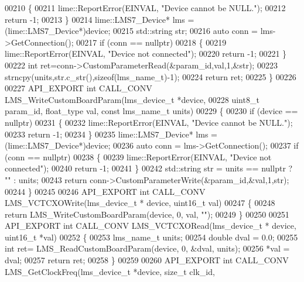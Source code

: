 \begin{DoxyCode}
00210     \{
00211         lime::ReportError(EINVAL, \textcolor{stringliteral}{"Device cannot be NULL."});
00212         \textcolor{keywordflow}{return} -1;
00213     \}
00214     lime::LMS7_Device* lms = (lime::LMS7_Device*)device;
00215     std::string str;
00216     \textcolor{keyword}{auto} conn = lms->GetConnection();
00217     \textcolor{keywordflow}{if} (conn == \textcolor{keyword}{nullptr})
00218     \{
00219         lime::ReportError(EINVAL, \textcolor{stringliteral}{"Device not connected"});
00220         \textcolor{keywordflow}{return} -1;
00221     \}
00222     \textcolor{keywordtype}{int} ret=conn->CustomParameterRead(&param\_id,val,1,&str);
00223     strncpy(units,str.c\_str(),\textcolor{keyword}{sizeof}(lms_name_t)-1);
00224     \textcolor{keywordflow}{return} ret;
00225 \}
00226 
00227 API_EXPORT \textcolor{keywordtype}{int} CALL_CONV LMS_WriteCustomBoardParam(lms_device_t *device,
00228                         uint8\_t param\_id, float_type val, \textcolor{keyword}{const} lms_name_t units)
00229 \{
00230     \textcolor{keywordflow}{if} (device == \textcolor{keyword}{nullptr})
00231     \{
00232         lime::ReportError(EINVAL, \textcolor{stringliteral}{"Device cannot be NULL."});
00233         \textcolor{keywordflow}{return} -1;
00234     \}
00235     lime::LMS7_Device* lms = (lime::LMS7_Device*)device;
00236     \textcolor{keyword}{auto} conn = lms->GetConnection();
00237     \textcolor{keywordflow}{if} (conn == \textcolor{keyword}{nullptr})
00238     \{
00239         lime::ReportError(EINVAL, \textcolor{stringliteral}{"Device not connected"});
00240         \textcolor{keywordflow}{return} -1;
00241     \}
00242     std::string str = units == \textcolor{keyword}{nullptr} ? \textcolor{stringliteral}{""} : units;
00243     \textcolor{keywordflow}{return} conn->CustomParameterWrite(&param\_id,&val,1,str);
00244 \}
00245 
00246 API_EXPORT \textcolor{keywordtype}{int} CALL_CONV LMS_VCTCXOWrite(lms_device_t * device, uint16\_t val)
00247 \{
00248     \textcolor{keywordflow}{return} LMS_WriteCustomBoardParam(device, 0, val, \textcolor{stringliteral}{""});
00249 \}
00250 
00251 API_EXPORT \textcolor{keywordtype}{int} CALL_CONV LMS_VCTCXORead(lms_device_t * device, uint16\_t *val)
00252 \{
00253     lms_name_t units;
00254     \textcolor{keywordtype}{double} dval = 0.0;
00255     \textcolor{keywordtype}{int} ret= LMS_ReadCustomBoardParam(device, 0, &dval, units);
00256     *val = dval;
00257     \textcolor{keywordflow}{return} ret;
00258 \}
00259 
00260 API_EXPORT \textcolor{keywordtype}{int} CALL_CONV LMS_GetClockFreq(lms_device_t *device, \textcolor{keywordtype}{size\_t} clk_id, 

\end{DoxyCode}
